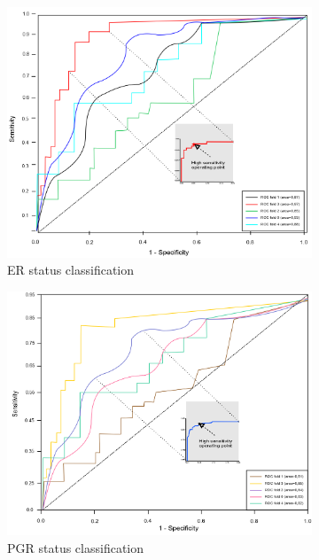 \begin{figure}
	\centering
	\begin{subfigure}{.49\linewidth}
		\centering
		\includegraphics[width=0.9\linewidth]{images/roc_er.png}
		\caption{ER status classification}
        \label{fig:er_roc}
	\end{subfigure}
	\begin{subfigure}{.49\linewidth}
		\centering
		\includegraphics[width=0.9\linewidth]{images/roc_pgr.png}
		\caption{PGR status classification}
        \label{fig:pgr_roc}
	\end{subfigure}\\[1ex]
	\begin{subfigure}{0.49\linewidth}
		\centering

\end{subfigure}
\end{figure}
